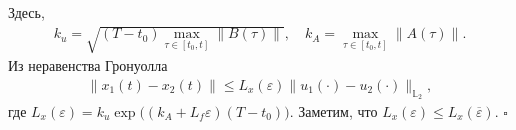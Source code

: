 \documentclass[../main.tex]{subfiles}
\begin{document}
Здесь, 
\begin{gather*}
    k_u = \sqrt{(T-t_0) \max\limits_{\tau \in [{t_0},t]}\|B(\tau)\|}, \quad k_A =\max\limits_{\tau \in [{t_0},t]} \| A(\tau)\|.
\end{gather*}
Из неравенства Гронуолла 
\begin{gather*}
    \| x_1(t) - x_2(t) \| \leqslant L_x(\varepsilon) \| u_1(\cdot) - u_2(\cdot) \|_{\mathbb{L}_2},
\end{gather*}
где $L_x(\varepsilon) = k_u \exp\big((k_A + L_f \varepsilon)(T - t_0)\big) $. Заметим, что $L_x(\varepsilon) \leqslant L_x(\overline{\varepsilon})$. 
\hfill$\square$\\[1ex]%



\end{document}
